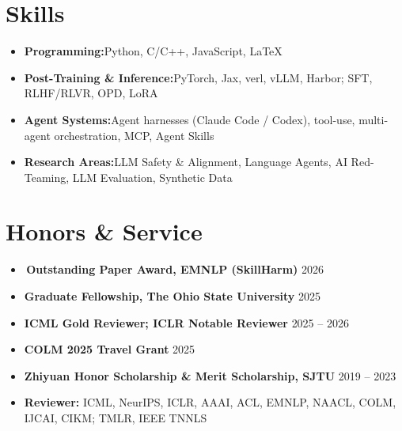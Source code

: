 \documentclass[a4paper,11pt]{article}
\newcommand{\paperaward}{\textcolor{awardgold}{\faTrophy}\,\textbf{Outstanding Paper Award}}
\newcommand{\resumeItem}[2]{
  \item{ \textbf{#1}{\hspace{0.5mm}#2 \vspace{-0.5mm}} }
}
\newcommand{\resumeSubItem}[2]{\resumeItem{#1}{#2}\vspace{-4pt}}
\newcommand{\resumeSubHeadingListStart}{\begin{itemize}[leftmargin=*,labelsep=1mm]}
\newcommand{\resumeHeadingSkillStart}{\begin{itemize}[leftmargin=*,itemsep=1.7mm, rightmargin=2ex]}
\newcommand{\resumeSubHeadingListEnd}{\end{itemize}\vspace{2mm}}
\newcommand{\resumeHeadingSkillEnd}{\end{itemize}\vspace{-2mm}}
\begin{document}
\section{\textbf{Skills}}
\vspace{-0.2mm}
\resumeHeadingSkillStart
  \resumeSubItem{Programming:}
    {Python, C/C++, JavaScript, \LaTeX}
  \resumeSubItem{Post-Training \& Inference:}
    {PyTorch, Jax, verl, vLLM, Harbor; SFT, RLHF/RLVR, OPD, LoRA}
  \resumeSubItem{Agent Systems:}
    {Agent harnesses (Claude Code / Codex), tool-use, multi-agent orchestration, MCP, Agent Skills}
  \resumeSubItem{Research Areas:}
    {LLM Safety \& Alignment, Language Agents, AI Red-Teaming, LLM Evaluation, Synthetic Data}
\resumeHeadingSkillEnd

\section{\textbf{Honors \& Service}}
\vspace{-0.2mm}
\resumeSubHeadingListStart
  \resumeItem{\paperaward, EMNLP (SkillHarm)}{ \hfill \footnotesize{2026}}
  \resumeItem{Graduate Fellowship, The Ohio State University}{ \hfill \footnotesize{2025}}
  \resumeItem{ICML Gold Reviewer; ICLR Notable Reviewer}{ \hfill \footnotesize{2025 -- 2026}}
  \resumeItem{COLM 2025 Travel Grant}{ \hfill \footnotesize{2025}}
  \resumeItem{Zhiyuan Honor Scholarship \& Merit Scholarship, SJTU}{ \hfill \footnotesize{2019 -- 2023}}
  \resumeItem{Reviewer:}{ ICML, NeurIPS, ICLR, AAAI, ACL, EMNLP, NAACL, COLM, IJCAI, CIKM; TMLR, IEEE TNNLS}
\resumeSubHeadingListEnd
\end{document}
